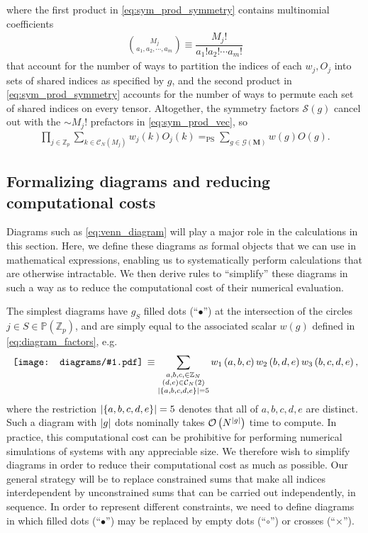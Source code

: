 \documentclass[nofootinbib,notitlepage,11pt]{revtex4-2}
\newcommand{\f}[2]{\dfrac{#1}{#2}} %
\newcommand{\p}[1]{\left(#1\right)} %
\renewcommand{\set}[1]{\left\{#1\right\}} %
\newcommand{\m}{\bm} %
\newcommand{\1}{\mathds{1}}
\newcommand{\C}{\mathcal{C}}
\newcommand{\G}{\mathcal{G}}
\renewcommand{\O}{\mathcal{O}}
\renewcommand{\S}{\mathcal{S}}
\newcommand{\PP}{\mathbb{P}}
\newcommand{\ZZ}{\mathbb{Z}}
\newcommand{\EQPS}{=_{\text{PS}}}
\newcommand{\diagram}[1]
{\,\texttt{[image: diagrams/\#1.pdf]}\,}
\begin{document}
where the first product in \eqref{eq:sym_prod_symmetry} contains
multinomial coefficients
\begin{align}
  {M_j \choose a_1,a_2,\cdots,a_m}
  \equiv \f{M_j!}{a_1!a_2!\cdots a_m!}
\end{align}
that account for the number of ways to partition the indices of each
$w_j,O_j$ into sets of shared indices as specified by $g$, and the
second product in \eqref{eq:sym_prod_symmetry} accounts for the number
of ways to permute each set of shared indices on every tensor.
Altogether, the symmetry factors $\S\p{g}$ cancel out with the
$\sim M_j!$ prefactors in \eqref{eq:sym_prod_vec}, so
\begin{align}
  \prod_{j\in\ZZ_p} \sum_{k\in\C_N\p{M_j}} w_j\p{k} O_j\p{k}
  \EQPS \sum_{g\in\G\p{\m M}} w\p{g} O\p{g}.
  \label{eq:sym_prod_group}
\end{align}

\subsection{Formalizing diagrams and reducing computational costs}
\label{sec:diagrams}

Diagrams such as \eqref{eq:venn_diagram} will play a major role in the
calculations in this section.  Here, we define these diagrams as
formal objects that we can use in mathematical expressions, enabling
us to systematically perform calculations that are otherwise
intractable.  We then derive rules to ``simplify'' these diagrams in
such a way as to reduce the computational cost of their numerical
evaluation.

The simplest diagrams have $g_S$ filled dots (``$\bullet$'') at the
intersection of the circles $j\in S\in\PP\p{\ZZ_p}$, and are simply
equal to the associated scalar $w\p{g}$ defined in
\eqref{eq:diagram_factors}, e.g.
\begin{align}
  \diagram{example_123}
  \equiv \sum_{\substack{a,b,c,\in\ZZ_N\\\p{d,e}\in\C_N\p{2}\\
      \abs{\set{a,b,c,d,e}}=5}}
  w_1\p{a,b,c} w_2\p{b,d,e} w_3\p{b,c,d,e},
\end{align}
where the restriction $\abs{\set{a,b,c,d,e}}=5$ denotes that all of
$a,b,c,d,e$ are distinct.  Such a diagram with $\abs{g}$ dots
nominally takes $\O\p{N^{\abs{g}}}$ time to compute.  In practice,
this computational cost can be prohibitive for performing numerical
simulations of systems with any appreciable size.  We therefore wish
to simplify diagrams in order to reduce their computational cost as
much as possible.  Our general strategy will be to replace constrained
sums that make all indices interdependent by unconstrained sums that
can be carried out independently, in sequence.  In order to represent
different constraints, we need to define diagrams in which filled dots
(``$\bullet$'') may be replaced by empty dots (``$\circ$'') or crosses
(``$\bm\times$'').
\end{document}
